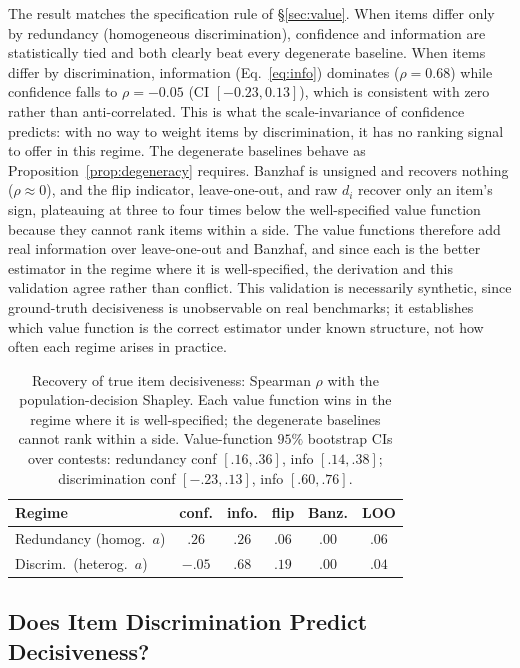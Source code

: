 \documentclass[conference]{IEEEtran}
\begin{document}
The result matches the specification rule of \S\ref{sec:value}.
When items differ only by redundancy (homogeneous discrimination), confidence and information are statistically tied and both clearly beat every degenerate baseline.
When items differ by discrimination, information (Eq.~\ref{eq:info}) dominates ($\rho=0.68$) while confidence falls to $\rho=-0.05$ (CI $[-0.23,0.13]$), which is consistent with zero rather than anti-correlated.
This is what the scale-invariance of confidence predicts: with no way to weight items by discrimination, it has no ranking signal to offer in this regime.
The degenerate baselines behave as Proposition~\ref{prop:degeneracy} requires.
Banzhaf is unsigned and recovers nothing ($\rho\approx0$), and the flip indicator, leave-one-out, and raw $d_i$ recover only an item's sign, plateauing at three to four times below the well-specified value function because they cannot rank items within a side.
The value functions therefore add real information over leave-one-out and Banzhaf, and since each is the better estimator in the regime where it is well-specified, the derivation and this validation agree rather than conflict.
This validation is necessarily synthetic, since ground-truth decisiveness is unobservable on real benchmarks; it establishes which value function is the correct estimator under known structure, not how often each regime arises in practice.

\begin{table}[t]
\centering
\caption{Recovery of true item decisiveness: Spearman $\rho$ with the population-decision Shapley. Each value function wins in the regime where it is well-specified; the degenerate baselines cannot rank within a side. Value-function $95\%$ bootstrap CIs over contests: redundancy conf $[.16,.36]$, info $[.14,.38]$; discrimination conf $[-.23,.13]$, info $[.60,.76]$.}
\label{tab:e18}
\footnotesize
\setlength{\tabcolsep}{5pt}
\begin{tabular}{@{}lccccc@{}}
\toprule
\textbf{Regime} & \textbf{conf.} & \textbf{info.} & \textbf{flip} & \textbf{Banz.} & \textbf{LOO} \\
\midrule
Redundancy (homog.\ $a$) & $.26$ & $.26$ & $.06$ & $.00$ & $.06$ \\
Discrim.\ (heterog.\ $a$) & $-.05$ & $.68$ & $.19$ & $.00$ & $.04$ \\
\bottomrule
\end{tabular}
\end{table}

\subsection{Does Item Discrimination Predict Decisiveness?}
\label{sec:extval}
\end{document}
